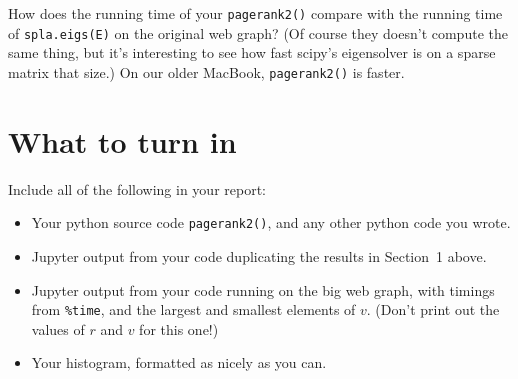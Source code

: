 \documentclass[11pt]{article}
\begin{document}
How does the running time of your {\tt pagerank2()} compare with the
running time of {\tt spla.eigs(E)} on the original web graph?
(Of course they doesn't compute the same thing, but it's interesting
to see how fast scipy's eigensolver is on a sparse matrix that size.)
On our older MacBook, {\tt pagerank2()} is faster.

\section{What to turn in}

Include all of the following in your report:
\begin{itemize}
\item 
Your python source code {\tt pagerank2()}, 
and any other python code you wrote.
\item 
Jupyter output from your code duplicating the results in Section~1 above.
\item 
Jupyter output from your code running on the big web graph,
with timings from {\tt \%time}, and the largest and smallest
elements of $v$.
(Don't print out the values of $r$ and $v$ for this one!)
\item 
Your histogram, formatted as nicely as you can.
\end{itemize}
\end{document}
